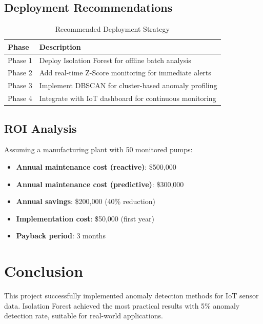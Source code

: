 \documentclass[12pt,a4paper]{report}
\begin{document}
\section{Deployment Recommendations}

\begin{table}[H]
\centering
\caption{Recommended Deployment Strategy}
\begin{tabular}{ll}
\toprule
\textbf{Phase} & \textbf{Description} \\
\midrule
Phase 1 & Deploy Isolation Forest for offline batch analysis \\
Phase 2 & Add real-time Z-Score monitoring for immediate alerts \\
Phase 3 & Implement DBSCAN for cluster-based anomaly profiling \\
Phase 4 & Integrate with IoT dashboard for continuous monitoring \\
\bottomrule
\end{tabular}
\end{table}

\section{ROI Analysis}

Assuming a manufacturing plant with 50 monitored pumps:
\begin{itemize}
    \item \textbf{Annual maintenance cost (reactive)}: \$500,000
    \item \textbf{Annual maintenance cost (predictive)}: \$300,000
    \item \textbf{Annual savings}: \$200,000 (40\% reduction)
    \item \textbf{Implementation cost}: \$50,000 (first year)
    \item \textbf{Payback period}: 3 months
\end{itemize}

\chapter{Conclusion}

This project successfully implemented anomaly detection methods for IoT sensor data. Isolation Forest achieved the most practical results with 5\% anomaly detection rate, suitable for real-world applications.
\end{document}

